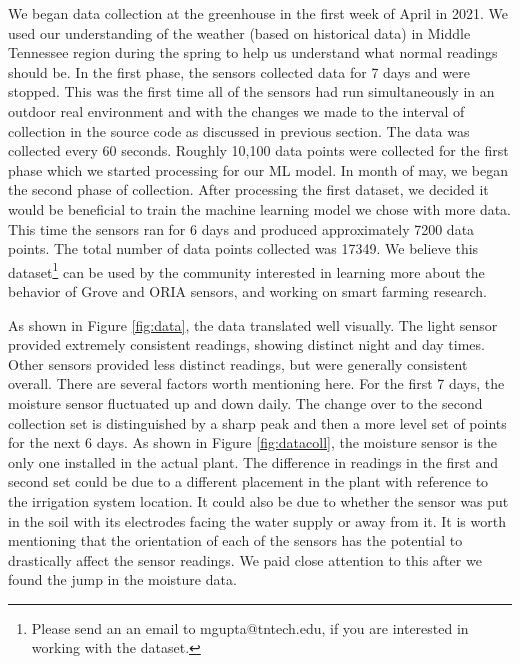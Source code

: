 We began data collection at the greenhouse in the first week of April in 2021. We used our understanding of the weather (based on historical data) in Middle Tennessee region during the spring to help us understand what normal readings should be. In the first phase, the sensors collected data for 7 days and were stopped. 
This was the first time all of the sensors had run simultaneously in an outdoor real environment and with the changes we made to the interval of collection in the source code as discussed in previous section. The data was collected every 60 seconds. Roughly 10,100 data points were collected for the first phase which we started processing for our ML model. In month of may, we began the second phase of collection. After processing the first dataset, we decided it would be beneficial to train the machine learning model we chose with more data. This time the sensors ran for 6 days and produced approximately 7200 data points. The total number of data points collected was 17349. We believe this dataset\footnote{Please send an an email to mgupta@tntech.edu, if you are interested in working with the dataset.} can be used by the community interested in learning more about the behavior of Grove and ORIA sensors, and working on smart farming research. %

As shown in Figure \ref{fig:data}, the data translated well visually. The light sensor provided extremely consistent readings, showing distinct night and day times. Other sensors provided less distinct readings, but were generally consistent overall. There are several factors worth mentioning here. For the first 7 days, the moisture sensor fluctuated up and down daily. The change over to the second collection set is distinguished by a sharp peak and then a more level set of points for the next 6 days. As shown in Figure \ref{fig:datacoll}, the moisture sensor is the only one installed in the actual plant. The difference in readings in the first and second set could be due to a different placement in the plant with reference to the irrigation system location. It could also be due to whether the sensor was put in the soil with its electrodes facing the water supply or away from it. It is worth mentioning that the orientation of each of the sensors has the potential to drastically affect the sensor readings. We paid close attention to this after we found the jump in the moisture data.

